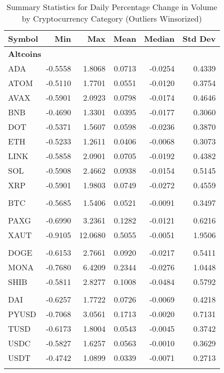 \begin{table}[ht]
\centering
\scriptsize
\setlength{\tabcolsep}{4pt}
\begin{tabular}{lrrrrr}
\toprule
Symbol & Min & Max & Mean & Median & Std Dev \\
\midrule
\multicolumn{6}{l}{\textbf{Altcoins}} \\
ADA & -0.5558 & 1.8068 & 0.0713 & -0.0254 & 0.4339 \\
ATOM & -0.5110 & 1.7701 & 0.0551 & -0.0120 & 0.3754 \\
AVAX & -0.5901 & 2.0923 & 0.0798 & -0.0174 & 0.4646 \\
BNB & -0.4690 & 1.3301 & 0.0395 & -0.0177 & 0.3060 \\
DOT & -0.5371 & 1.5607 & 0.0598 & -0.0236 & 0.3870 \\
ETH & -0.5233 & 1.2611 & 0.0406 & -0.0068 & 0.3073 \\
LINK & -0.5858 & 2.0901 & 0.0705 & -0.0192 & 0.4382 \\
SOL & -0.5908 & 2.4662 & 0.0938 & -0.0154 & 0.5145 \\
XRP & -0.5901 & 1.9803 & 0.0749 & -0.0272 & 0.4559 \\
\addlinespace
\multicolumn{6}{l}{\textbf{Bitcoin}} \\
BTC & -0.5685 & 1.5406 & 0.0521 & -0.0091 & 0.3497 \\
\addlinespace
\multicolumn{6}{l}{\textbf{Gold Pegged}} \\
PAXG & -0.6990 & 3.2361 & 0.1282 & -0.0121 & 0.6216 \\
XAUT & -0.9105 & 12.0680 & 0.5055 & -0.0051 & 1.9506 \\
\addlinespace
\multicolumn{6}{l}{\textbf{Meme Coins}} \\
DOGE & -0.6153 & 2.7661 & 0.0920 & -0.0217 & 0.5411 \\
MONA & -0.7680 & 6.4209 & 0.2344 & -0.0276 & 1.0448 \\
SHIB & -0.5811 & 2.8277 & 0.1008 & -0.0484 & 0.5792 \\
\addlinespace
\multicolumn{6}{l}{\textbf{Stablecoins}} \\
DAI & -0.6257 & 1.7722 & 0.0726 & -0.0069 & 0.4218 \\
PYUSD & -0.7068 & 3.0561 & 0.1713 & -0.0020 & 0.7131 \\
TUSD & -0.6173 & 1.8004 & 0.0543 & -0.0045 & 0.3742 \\
USDC & -0.5827 & 1.6257 & 0.0563 & -0.0010 & 0.3629 \\
USDT & -0.4742 & 1.0899 & 0.0339 & -0.0071 & 0.2713 \\
\addlinespace
\bottomrule
\end{tabular}
\caption{Summary Statistics for Daily Percentage Change in Volume by Cryptocurrency Category (Outliers Winsorized)}
\label{tab:crypto_volume_change_summary}
\end{table}
